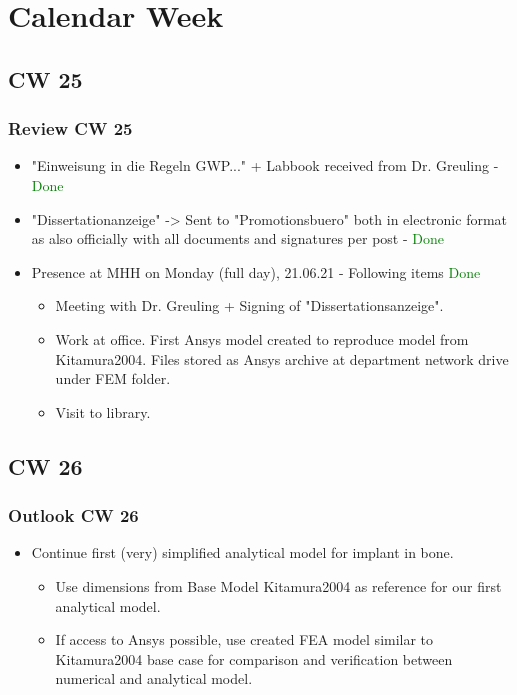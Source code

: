 \section{Calendar Week}
\subsection{CW 25}
\begin{frame}
  \frametitle{Review CW 25}
	\begin{itemize}
	\item "Einweisung in die Regeln GWP..." + Labbook received from Dr. Greuling - \textcolor{green}{Done}
	\item "Dissertationanzeige" -> Sent to "Promotionsbuero" both in electronic format as also officially with all documents and signatures per post - \textcolor{green}{Done} 
		\item Presence at MHH on Monday (full day), 21.06.21 - Following items \textcolor{green}{Done}
		\begin{itemize}
			\item Meeting with Dr. Greuling + Signing of "Dissertationsanzeige".
			\item Work at office. First Ansys model created to reproduce model from Kitamura2004. Files stored as Ansys archive at department network drive under FEM folder.
			\item Visit to library.
		\end{itemize}
	
	\end{itemize}
\end{frame}
\subsection{CW 26}
\begin{frame}
  \frametitle{Outlook CW 26}
  \begin{itemize}
		\item Continue first (very) simplified analytical model for implant in bone.
		\begin{itemize}
			\item Use dimensions from Base Model Kitamura2004 as reference for our first analytical model.
			\item If access to Ansys possible, use created FEA model similar to Kitamura2004 base case for comparison and verification between numerical and analytical model.
		\end{itemize}
	\end{itemize}
\end{frame}

